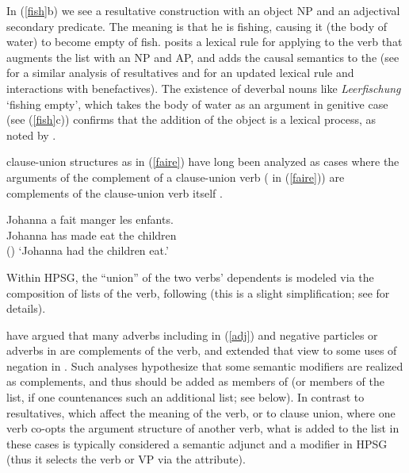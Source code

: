 \documentclass[output=paper,biblatex,babelshorthands,newtxmath,draftmode,colorlinks, citecolor=brown]{langscibook}
\begin{document}
\largerpage
\noindent
 In (\ref{fish}b) we see a resultative construction with an object NP and an adjectival secondary predicate.
 The meaning is that he is fishing, causing it (the body of water) to become empty of fish.  \citet[241]{Mueller2002b} posits a lexical rule for  applying to the verb that augments the \argst list with an NP and AP, and adds the causal semantics to the \content (see \citealt{Wechsler2005result} for a similar analysis of  resultatives and \citealt[Section~7.2.3]{MuellerLFGphrasal} for an updated lexical rule and interactions with benefactives).     The existence of deverbal nouns like \textit{Leerfischung} `fishing empty', which takes the body of water as an argument in genitive case (see (\ref{fish}c)) confirms that the addition of the object is a lexical process, as noted by \citet{Mueller2002b}.  

 clause-union structures as in (\ref{faire}) have long been analyzed as cases where the arguments of the complement of a clause-union verb ( in (\ref{faire})) are complements of the clause-union verb itself \citep{Aissen1979}.

\begin{exe}
\ex \label{faire}
\gll Johanna a fait manger les enfants. \\
     Johanna has made eat the children \\\hfill()
\glt `Johanna had the children eat.'
\end{exe}

\noindent
Within HPSG, the ``union'' of the two verbs' dependents is modeled via the composition of \argst lists of the  verb, following \citet{HinrichsandNakazawa1994} (this is a slight simplification; see   for details). 

\citet{AbeilleandGodard1997} have argued that many adverbs including  in (\ref{adj}) and negative particles or adverbs in  are complements of the verb, and \citet{KimandSag2002} extended that view to some uses of negation in . Such analyses hypothesize that some semantic modifiers are realized as complements, and thus should be added as members of \argst (or members of the \deps list, if one countenances such an additional list; see below). In contrast to resultatives, which affect the meaning of the verb, or to clause union, where one verb co-opts the argument structure of another verb, what is added to the \argst list in these cases is typically considered a semantic adjunct and a modifier in HPSG (thus it selects the verb or VP via the  attribute). 
\end{document}
